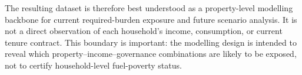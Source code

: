 The resulting dataset is therefore best understood as a property-level modelling backbone for current required-burden exposure and future scenario analysis. It is not a direct observation of each household's income, consumption, or current tenure contract. This boundary is important: the modelling design is intended to reveal which property--income--governance combinations are likely to be exposed, not to certify household-level fuel-poverty status.
